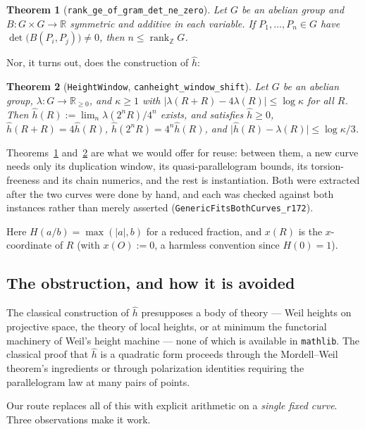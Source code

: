 \documentclass[11pt,reqno]{amsart}
\theoremstyle{plain}
\newtheorem{theorem}{Theorem}[section]
\theoremstyle{definition}
\theoremstyle{remark}
\DeclareRobustCommand{\lt}[1]{\texttt{#1}}
\newcommand{\hh}{\widehat{h}}
\newcommand{\nh}{H}
\DeclareMathOperator{\rank}{rank}
\begin{document}
\begin{theorem}[\lt{rank\_ge\_of\_gram\_det\_ne\_zero}]\label{thm:gram}
Let $G$ be an abelian group and $B \colon G \times G \to \mathbb{R}$ symmetric
and additive in each variable. If $P_1,\dots,P_n \in G$ have
$\det\bigl(B(P_i,P_j)\bigr) \ne 0$, then $n \le \rank_{\mathbb{Z}} G$.
\end{theorem}

Nor, it turns out, does the construction of $\hh$:

\begin{theorem}[\lt{HeightWindow}, \lt{canheight\_window\_shift}]\label{thm:generic}
Let $G$ be an abelian group, $\lambda \colon G \to \mathbb{R}_{\ge 0}$, and
$\kappa \ge 1$ with
$\lvert \lambda(R+R) - 4\lambda(R)\rvert \le \log\kappa$ for all $R$. Then
$\hh(R) := \lim_n \lambda(2^nR)/4^n$ exists, and satisfies $\hh \ge 0$,
$\hh(R+R) = 4\hh(R)$, $\hh(2^nR) = 4^n\hh(R)$, and
$\lvert \hh(R) - \lambda(R)\rvert \le \log\kappa/3$.
\end{theorem}

Theorems~\ref{thm:gram} and~\ref{thm:generic} are what we would offer for
reuse: between them, a new curve needs only its duplication window, its
quasi-parallelogram bounds, its torsion-freeness and its chain numerics, and
the rest is instantiation. Both were extracted after the two curves were done
by hand, and each was checked against both instances rather than merely
asserted (\lt{GenericFitsBothCurves\_r172}).

Here $\nh(a/b) = \max(\lvert a\rvert, b)$ for a reduced fraction, and $x(R)$
is the $x$-coordinate of $R$ (with $x(O) := 0$, a harmless convention since
$\nh(0) = 1$).

\subsection{The obstruction, and how it is avoided}

The classical construction of $\hh$ presupposes a body of theory --- Weil
heights on projective space, the theory of local heights, or at minimum the
functorial machinery of Weil's height machine --- none of which is available
in \texttt{mathlib}. The classical proof that $\hh$ is a quadratic form
proceeds through the Mordell--Weil theorem's ingredients or through
polarization identities requiring the parallelogram law at many pairs of
points.

Our route replaces all of this with explicit arithmetic on a \emph{single
fixed curve}. Three observations make it work.
\end{document}

